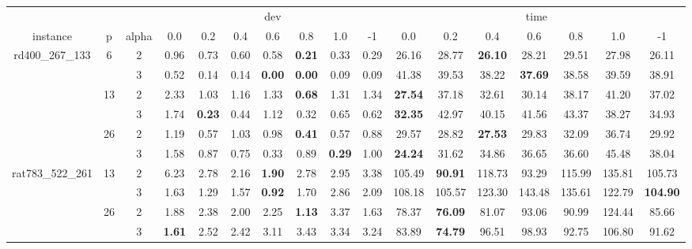 \begin{tabular}{|ccc|ccccccc|ccccccc|}
    \toprule
        & & & \multicolumn{7}{c|}{dev} &                   \multicolumn{7}{c|}{time} \\
        instance & p & alpha &  0.0 &  0.2 &  0.4 &  0.6 &  0.8 &  1.0 &   -1 &    0.0 &    0.2 &    0.4 &    0.6 &    0.8 &    1.0 &     -1 \\
    \midrule
    
        \multirow[c]{6}{*}{rd400\_267\_133} & \multirow[c]{2}{*}{6} & 2 & 0.96 & 0.73 & 0.60 & 0.58 & \bfseries 0.21 & 0.33 & 0.29 & 26.16 & 28.77 & \bfseries 26.10 & 28.21 & 29.51 & 27.98 & 26.11 \\
        &  & 3 & 0.52 & 0.14 & 0.14 & \bfseries 0.00 & \bfseries 0.00 & 0.09 & 0.09 & 41.38 & 39.53 & 38.22 & \bfseries 37.69 & 38.58 & 39.59 & 38.91 \\

    \cline{2-17}
 
        & \multirow[c]{2}{*}{13} & 2 & 2.33 & 1.03 & 1.16 & 1.33 & \bfseries 0.68 & 1.31 & 1.34 & \bfseries 27.54 & 37.18 & 32.61 & 30.14 & 38.17 & 41.20 & 37.02 \\
        &  & 3 & 1.74 & \bfseries 0.23 & 0.44 & 1.12 & 0.32 & 0.65 & 0.62 & \bfseries 32.35 & 42.97 & 40.15 & 41.56 & 43.37 & 38.27 & 34.93 \\

    \cline{2-17}
    
        & \multirow[c]{2}{*}{26} & 2 & 1.19 & 0.57 & 1.03 & 0.98 & \bfseries 0.41 & 0.57 & 0.88 & 29.57 & 28.82 & \bfseries 27.53 & 29.83 & 32.09 & 36.74 & 29.92 \\
        &  & 3 & 1.58 & 0.87 & 0.75 & 0.33 & 0.89 & \bfseries 0.29 & 1.00 & \bfseries 24.24 & 31.62 & 34.86 & 36.65 & 36.60 & 45.48 & 38.04 \\
    
    \cline{1-17}
    \cline{2-17}
        \multirow[c]{6}{*}{rat783\_522\_261} & \multirow[c]{2}{*}{13} & 2 & 6.23 & 2.78 & 2.16 & \bfseries 1.90 & 2.78 & 2.95 & 3.38 & 105.49 & \bfseries 90.91 & 118.73 & 93.29 & 115.99 & 135.81 & 105.73 \\
        &  & 3 & 1.63 & 1.29 & 1.57 & \bfseries 0.92 & 1.70 & 2.86 & 2.09 & 108.18 & 105.57 & 123.30 & 143.48 & 135.61 & 122.79 & \bfseries 104.90 \\
    
    \cline{2-17}
    
        & \multirow[c]{2}{*}{26} & 2 & 1.88 & 2.38 & 2.00 & 2.25 & \bfseries 1.13 & 3.37 & 1.63 & 78.37 & \bfseries 76.09 & 81.07 & 93.06 & 90.99 & 124.44 & 85.66 \\
        &  & 3 & \bfseries 1.61 & 2.52 & 2.42 & 3.11 & 3.43 & 3.34 & 3.24 & 83.89 & \bfseries 74.79 & 96.51 & 98.93 & 92.75 & 106.80 & 91.62 \\
    

\end{tabular}
